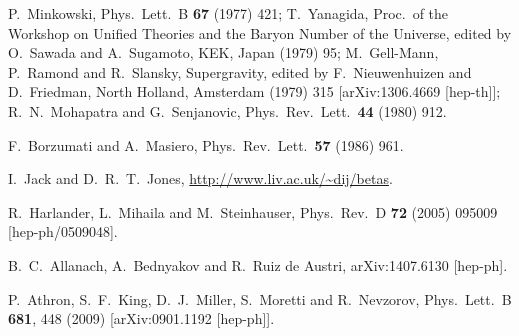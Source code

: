 \documentclass[final,3p,11pt,pdflatex]{elsarticle}
\newcommand{\ptitle}[1]{\emph{#1}}
\renewcommand{\ptitle}[1]{}
\begin{document}
\begin{thebibliography}{100}
  P.~Minkowski, \ptitle{
  $\mu \rightarrow e \gamma$ at a Rate of One Out of 1-Billion Muon Decays?,}
  Phys.\ Lett.\ B {\bf 67} (1977) 421;
  T.~Yanagida, \ptitle{
  Horizontal Symmetry And Masses Of Neutrinos,}
  Proc.\ of the
  Workshop on Unified Theories and the Baryon Number of the Universe,
  edited by O.~Sawada and A.~Sugamoto, KEK, Japan (1979) 95;
  M.~Gell-Mann, P.~Ramond and R.~Slansky, \ptitle{
  Complex Spinors and Unified Theories,}
  Supergravity, edited by F.~Nieuwenhuizen and
  D.~Friedman, North Holland, Amsterdam (1979) 315
  [arXiv:1306.4669 [hep-th]];
  R.~N.~Mohapatra and G.~Senjanovic, \ptitle{
  Neutrino Mass and Spontaneous Parity Nonconservation,}
  Phys.\ Rev.\ Lett.\  {\bf 44} (1980) 912.

  F.~Borzumati and A.~Masiero, \ptitle{
Large Muon- and electron-Number Nonconservation in Supergravity Theories,}
  Phys.\ Rev.\ Lett.\  {\bf 57} (1986) 961.

  I.~Jack and D.~R.~T.~Jones, \ptitle{
    3-loop MSSM beta functions,}
  \url{http://www.liv.ac.uk/~dij/betas}.

  R.~Harlander, L.~Mihaila and M.~Steinhauser,
  Phys.\ Rev.\ D {\bf 72} (2005) 095009
  [hep-ph/0509048].

  B.~C.~Allanach, A.~Bednyakov and R.~Ruiz de Austri,
  arXiv:1407.6130 [hep-ph].

  P.~Athron, S.~F.~King, D.~J.~Miller, S.~Moretti and R.~Nevzorov,
  Phys.\ Lett.\ B {\bf 681}, 448 (2009)
  [arXiv:0901.1192 [hep-ph]].



\end{thebibliography}
\end{document}
